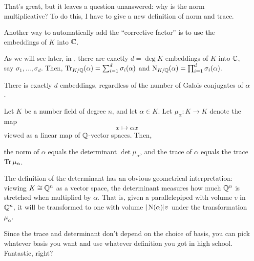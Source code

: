That's great, but it leaves a question unanswered:
why is the norm multiplicative?
To do this, I have to give a new definition of norm and trace.

\begin{remark}
	Another way to automatically add the ``corrective factor'' is to use the
	embeddings of $K$ into $\mathbb C$.

	As we will see later, in , there are exactly
	$d=\deg K$ embeddings of $K$ into $\mathbb C$, say $\sigma_1, \dots, \sigma_d$.
	Then,
	$\operatorname{Tr}_{K/\mathbb Q}(\alpha) = \sum_{i=1}^d \sigma_i(\alpha)$ and
	$\operatorname{N}_{K/\mathbb Q}(\alpha) = \prod_{i=1}^d \sigma_i(\alpha)$.

	There is exactly $d$ embeddings, regardless of the number of Galois
	conjugates of $\alpha$.
\end{remark}

\begin{theorem}
	Let $K$ be a number field of degree $n$, and let $\alpha \in K$.
	Let $\mu_\alpha \colon K \to K$ denote the map \[ x \mapsto \alpha x \]
	viewed as a linear map of $\mathbb Q$-vector spaces.
	Then,
	\begin{itemize}
		\ii the norm of $\alpha$ equals the determinant $\det \mu_\alpha$, and
		\ii the trace of $\alpha$ equals the trace $\operatorname{Tr} \mu_\alpha$.
	\end{itemize}
\end{theorem}
The definition of the determinant has an obvious geometrical interpretation:
viewing $K \cong \mathbb Q^n$ as a vector space, the determinant measures how much $\mathbb Q^n$ is
stretched when multiplied by $\alpha$.
That is, given a parallelepiped with volume $v$ in $\mathbb Q^n$, it will be transformed to one with
volume $|\operatorname{N}(\alpha)| v$ under the transformation $\mu_\alpha$.

Since the trace and determinant don't depend on the choice of basis,
you can pick whatever basis you want
and use whatever definition you got in high school.
Fantastic, right?

